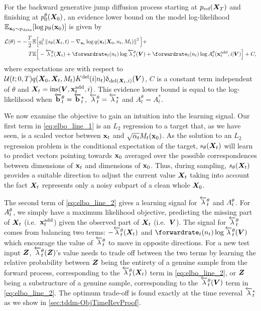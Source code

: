 \begin{proposition}
\label{prop:elbo}
For the backward generative jump diffusion process starting at $p_{\textup{ref}}({\bm{X}}_T)$ and finishing at $ p_0^\theta({\bm{X}}_0)$, an evidence lower bound on the model log-likelihood $ \mathbb{E}_{{\mathbf{x}}_0 \sim p_{\rm{data}}} [ \log p_\theta({\mathbf{x}}_0) ]$ is given by
\begin{align}
    \label{eq:elbo_line_1}
    \mathcal{L}(\theta) = -\frac{T}{2} \mathbb{E}\Big[& \diffcoeff_t^2 \norm{s_\theta(\mX_t, t) - \nabla_{\rvx_t} \log q(\rvx_t | \mX_0, n_t, M_t)   }^2 \Big] + \\
    \label{eq:elbo_line_2}
    T \mathbb{E} \Big[& - \backwardrate_{t}^\theta(\mX_t) + \forwardrate_t (n_t) \log \backwardrate_{t}^\theta(\mV) + \forwardrate_t(n_t) \log \autonet_{t}^\theta(\xadd_t, i | \mV) \Big] + C,
\end{align}
where expectations are with respect to $\mathcal{U}(t; 0, T) q({\bm{X}}_0, {\bm{X}}_t, M_t) K^{\textup{del}}(i | n_t) \updelta_{\textup{del}({\bm{X}}_t, i)} ({\bm{V}})$, $C$ is a constant term independent of $\theta$ and ${\bm{X}}_t = \text{ins}({\bm{V}}, {\mathbf{x}}^{\textup{add}}_t, i)$.
This evidence lower bound is equal to the log-likelihood when $\overleftarrow{\mathbf{b}}_t^\theta = \overleftarrow{\mathbf{b}}_t^*$, $\overleftarrow{\lambda}_t^\theta = \overleftarrow{\lambda}_t^*$ and $A_t^\theta = A_t^*$.

\end{proposition}


We now examine the objective to gain an intuition into the learning signal.
Our first term in \cref{eq:elbo_line_1} is an $L_2$ regression to a target that, as we have seen, is a scaled vector between ${\mathbf{x}}_t$ and $\sqrt{\alpha_t}M_t({\mathbf{x}}_0)$.
As the solution to an $L_2$ regression problem is the conditional expectation of the target, $s_\theta({\bm{X}}_t)$ will learn to predict vectors pointing towards ${\mathbf{x}}_0$ averaged over the possible correspondences between dimensions of ${\mathbf{x}}_t$ and dimensions of ${\mathbf{x}}_0$.
Thus, during sampling, $s_\theta({\bm{X}}_t)$ provides a suitable direction to adjust the current value ${\bm{X}}_t$ taking into account the fact ${\bm{X}}_t$ represents only a noisy subpart of a clean whole ${\bm{X}}_0$.

The second term of \cref{eq:elbo_line_2} gives a learning signal for $\overleftarrow{\lambda}_{t}^\theta$ and $A_{t}^\theta$.
For $A_{t}^\theta$, we simply have a maximum likelihood objective, predicting the missing part of ${\bm{X}}_t$ (i.e.~${\mathbf{x}}^{\textup{add}}_t$) given the observed part of ${\bm{X}}_t$ (i.e.~${\bm{V}}$).
The signal for $\overleftarrow{\lambda}_{t}^\theta$ comes from balancing two terms: $-\overleftarrow{\lambda}_{t}^\theta({\bm{X}}_t)$ and $\forwardrate_t(n_t) \log \backwardrate_{t}^\theta(\mV)$ which encourage the value of $\overleftarrow{\lambda}_{t}^\theta$ to move in opposite directions. For a new test input ${\bm{Z}}$, $\overleftarrow{\lambda}_{t}^\theta({\bm{Z}})$'s value needs to trade off between the two terms by learning the relative probability between ${\bm{Z}}$ being the entirety of a genuine sample from the forward process, corresponding to the $\overleftarrow{\lambda}_t^\theta({\bm{X}}_t)$ term in \cref{eq:elbo_line_2}, or ${\bm{Z}}$ being a substructure of a genuine sample, corresponding to the $\overleftarrow{\lambda}_t^\theta({\bm{V}})$ term in \cref{eq:elbo_line_2}. The optimum trade-off is found exactly at the time reversal $\overleftarrow{\lambda}_{t}^*$ as we show in \cref{sec:tddm-ObjTimeRevProof}.

